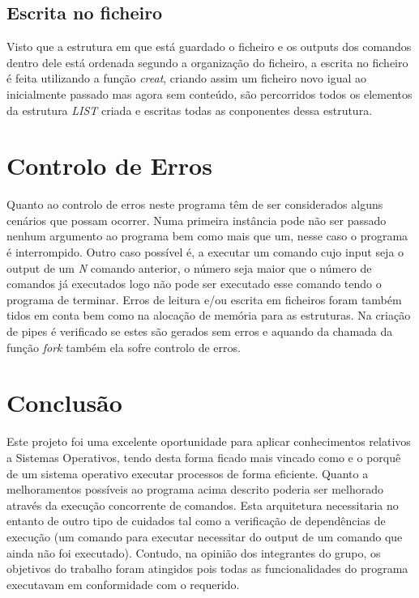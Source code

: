 \subsection{Escrita no ficheiro}
Visto que a estrutura em que está guardado o ficheiro e os outputs dos comandos dentro dele está ordenada segundo a organização do ficheiro, a escrita no ficheiro é feita utilizando a função \textit{\textit{creat}}, criando assim um ficheiro novo igual ao inicialmente passado mas agora sem conteúdo, são percorridos todos os elementos da estrutura \textit{LIST} criada e escritas todas as conponentes dessa estrutura.

\section{Controlo de Erros}

Quanto ao controlo de erros neste programa têm de ser considerados alguns cenários que possam ocorrer. Numa primeira instância pode não ser passado nenhum argumento ao programa bem como mais que um, nesse caso o programa é interrompido. Outro caso possível é, a executar um comando cujo input seja o output de um \textit{N} comando anterior, o número seja maior que o número de comandos já executados logo não pode ser executado esse comando tendo o programa de terminar. Erros de leitura e/ou escrita em ficheiros foram também tidos em conta bem como na alocação de memória para as estruturas. Na criação de pipes é verificado se estes são gerados sem erros e aquando da chamada da função \textit{fork} também ela sofre controlo de erros.

\section{Conclusão}
Este projeto foi uma excelente oportunidade para aplicar conhecimentos relativos a Sistemas Operativos, tendo desta forma ficado mais vincado como e o porquê de um sistema operativo executar processos de forma eficiente. Quanto a melhoramentos possíveis ao programa acima descrito poderia ser melhorado através da execução concorrente de comandos. Esta arquitetura necessitaria no entanto de outro tipo de cuidados tal como a verificação de dependências de execução (um comando para executar necessitar do output de um comando que ainda não foi executado). Contudo, na opinião dos integrantes do grupo, os objetivos do trabalho foram atingidos pois todas as funcionalidades do programa executavam em conformidade com o requerido. 

